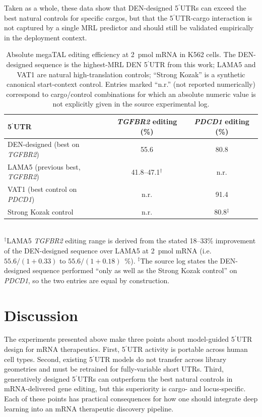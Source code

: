 \documentclass[11pt]{article}
\begin{document}
Taken as a whole, these data show that DEN-designed
5$^\prime$UTRs can exceed the best natural controls for specific
cargos, but that the 5$^\prime$UTR-cargo interaction is not captured
by a single MRL predictor and should still be validated empirically
in the deployment context.

\begin{table}[htbp]
\centering
\caption{Absolute megaTAL editing efficiency at 2~pmol mRNA in K562
cells. The DEN-designed sequence is the highest-MRL DEN 5$^\prime$UTR
from this work; LAMA5 and VAT1 are natural high-translation controls;
``Strong Kozak'' is a synthetic canonical start-context control. Entries
marked ``n.r.'' (not reported numerically) correspond to cargo/control
combinations for which an absolute numeric value is not explicitly
given in the source experimental log.}
\label{tab:editing}
\begin{tabular}{lcc}
\toprule
5$^\prime$UTR & \emph{TGFBR2} editing (\%) & \emph{PDCD1} editing (\%) \\
\midrule
DEN-designed (best on \emph{TGFBR2}) & 55.6 & 80.8 \\
LAMA5 (previous best, \emph{TGFBR2}) & 41.8--47.1$^{\dagger}$ & n.r. \\
VAT1 (best control on \emph{PDCD1}) & n.r. & 91.4 \\
Strong Kozak control & n.r. & 80.8$^{\ddagger}$ \\
\bottomrule
\end{tabular}
\\[2pt]
{\footnotesize
$^{\dagger}$LAMA5 \emph{TGFBR2} editing range is derived from the
stated 18--33\% improvement of the DEN-designed sequence over LAMA5
at 2~pmol mRNA (i.e.\ $55.6/(1+0.33)$ to $55.6/(1+0.18)$~\%).
$^{\ddagger}$The source log states the DEN-designed sequence performed
``only as well as the Strong Kozak control'' on \emph{PDCD1}, so the
two entries are equal by construction.}
\end{table}

\section{Discussion}

The experiments presented above make three points about model-guided
5$^\prime$UTR design for mRNA therapeutics. First, 5$^\prime$UTR
activity is portable across human cell types. Second, existing
5$^\prime$UTR models do not transfer across library geometries and
must be retrained for fully-variable short UTRs. Third, generatively
designed 5$^\prime$UTRs can outperform the best natural controls in
mRNA-delivered gene editing, but this superiority is cargo- and
locus-specific. Each of these points has practical consequences for
how one should integrate deep learning into an mRNA therapeutic
discovery pipeline.
\end{document}
